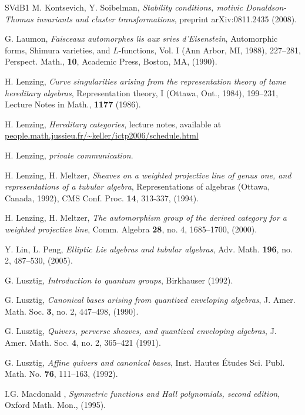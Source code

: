 \documentclass[a4paper,10pt]{amsart}
\numberwithin{equation}{section}
\begin{document}
{{\begin{thebibliography}{SVdB1}
M. Kontsevich, Y. Soibelman, \emph{Stability conditions, motivic Donaldson-Thomas invariants and cluster transformations}, preprint arXiv:0811.2435 (2008).

G. Laumon, \emph{Faisceaux automorphes lis aux sries d'Eisenstein}, Automorphic forms, Shimura varieties, and $L$-functions, Vol. I (Ann Arbor, MI, 1988), 227--281, Perspect. Math., \textbf{10}, Academic Press, Boston, MA, (1990).

H. Lenzing, \emph{Curve singularities arising from the representation theory of tame hereditary algebras}, Representation theory, I (Ottawa, Ont., 1984), 199--231,
Lecture Notes in Math., \textbf{1177} (1986).

H. Lenzing, \emph{Hereditary categories}, lecture notes, available at \url{people.math.jussieu.fr/~keller/ictp2006/schedule.html}

H. Lenzing, \emph{private communication}.

H. Lenzing, H. Meltzer, \emph{Sheaves on a weighted projective line
of genus one, and representations
of a tubular algebra}, Representations of algebras (Ottawa, Canada,
1992), CMS Conf. Proc. \textbf{14},
313-337, (1994).

H. Lenzing, H. Meltzer, \emph{The automorphism group of the derived category for a weighted projective line}, Comm. Algebra \textbf{28}, no. 4, 1685--1700, (2000).

Y. Lin, L. Peng, \emph{Elliptic Lie algebras and tubular algebras},
Adv. Math. \textbf{196}, no. 2, 487--530, (2005).

G. Lusztig, \emph{Introduction to quantum groups}, Birkhauser (1992).

 G. Lusztig, \emph{Canonical bases arising from quantized enveloping algebras}, J. Amer. Math. Soc. \textbf{3}, no. 2, 447--498, (1990).

G. Lusztig, \emph{Quivers, perverse sheaves, and quantized enveloping algebras}, J. Amer. Math. Soc. \textbf{4}, no. 2, 365--421 (1991).

G. Lusztig, \emph{Affine quivers and canonical bases}, Inst. Hautes \'Etudes Sci. Publ. Math. No. \textbf{76}, 111--163, (1992).

I.G. Macdonald , \emph{Symmetric functions and Hall polynomials, second edition}, Oxford Math. Mon., (1995).


\end{thebibliography}}}
\end{document}
